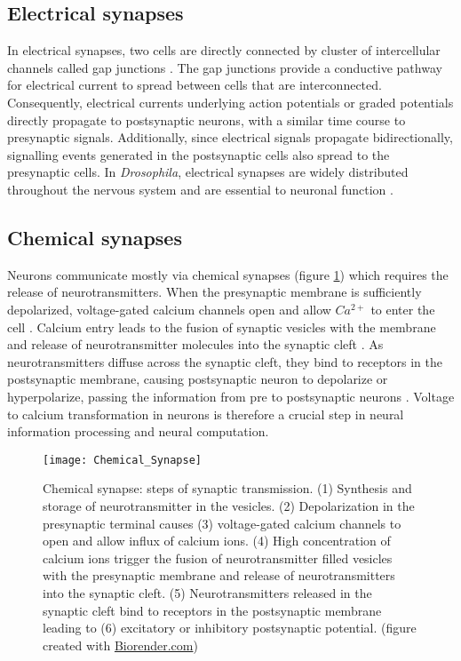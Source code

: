 \subsection{Electrical synapses}
In electrical synapses, two cells are directly connected by cluster of intercellular channels called gap junctions \parencite{Bennett2004}. The gap junctions provide a conductive pathway for electrical current to spread between cells that are interconnected. Consequently, electrical currents underlying action potentials or graded potentials directly propagate to postsynaptic neurons, with a similar time course to presynaptic signals. Additionally, since electrical signals propagate bidirectionally, signalling events generated in the postsynaptic cells also spread to the presynaptic cells. In \textit{Drosophila}, electrical synapses are widely distributed throughout the nervous system and are essential to neuronal function \parencite{Ammer2022}.



\subsection{Chemical synapses}
Neurons communicate mostly via chemical synapses (figure  \ref{fig:chemicalsynapse}) which requires the release of neurotransmitters. When the presynaptic membrane is sufficiently depolarized, voltage-gated calcium channels open and allow $Ca^{2+}$ to enter the cell \parencite{Luo2020}. Calcium entry leads to the fusion of synaptic vesicles with the membrane and release of neurotransmitter molecules into the synaptic cleft \parencite{Chapman2002}.  As neurotransmitters diffuse across the synaptic cleft, they bind to receptors in the postsynaptic membrane, causing postsynaptic neuron to depolarize or hyperpolarize, passing the information from pre to postsynaptic neurons \parencite{Maio2008}. Voltage to calcium transformation in neurons is therefore a crucial step in neural information processing and neural computation. 

\begin{figure}
\centering
\hspace*{-1cm} 
\texttt{[image: Chemical\_Synapse]}
\caption[Chemical synapse: steps of synaptic transmission] {Chemical synapse: steps of synaptic transmission. (1) Synthesis and storage of neurotransmitter in the vesicles. (2) Depolarization in the presynaptic terminal causes (3) voltage-gated calcium channels to open and allow influx of calcium ions. (4) High concentration of calcium ions trigger the fusion of neurotransmitter filled vesicles with the presynaptic membrane and release of neurotransmitters into the synaptic cleft. (5) Neurotransmitters released in the synaptic cleft bind to receptors in the postsynaptic membrane leading to (6) excitatory or inhibitory postsynaptic potential. (figure created with \href{https://app.biorender.com/biorender-templates}{Biorender.com})}
\label{fig:chemicalsynapse}
\end{figure}

